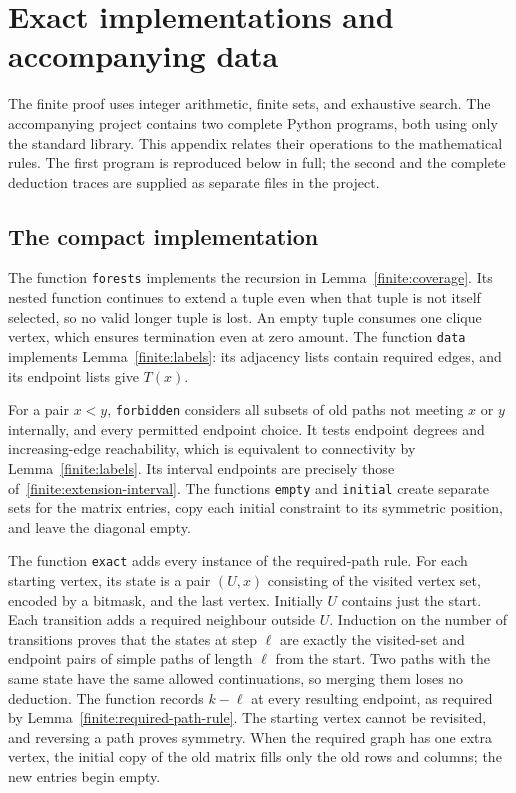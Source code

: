 \section{Exact implementations and accompanying data}
\label{app:implementation}

The finite proof uses integer arithmetic, finite sets, and exhaustive
search. The accompanying project contains two complete Python programs,
both using only the standard library. This appendix relates their
operations to the mathematical rules. The first program is reproduced
below in full; the second and the complete deduction traces are supplied
as separate files in the project.

\subsection{The compact implementation}

The function \texttt{forests} implements the recursion in
Lemma~\ref{finite:coverage}. Its nested function continues to extend a
tuple even when that tuple is not itself selected, so no valid longer
tuple is lost. An empty tuple consumes one clique vertex, which ensures
termination even at zero amount. The function \texttt{data} implements
Lemma~\ref{finite:labels}: its adjacency lists contain required edges,
and its endpoint lists give $T(x)$.

For a pair $x<y$, \texttt{forbidden} considers all subsets of old paths
not meeting $x$ or $y$ internally, and every permitted endpoint choice.
It tests endpoint degrees and increasing-edge reachability, which is
equivalent to connectivity by Lemma~\ref{finite:labels}. Its interval
endpoints are precisely those of~\eqref{finite:extension-interval}.
The functions \texttt{empty} and \texttt{initial} create separate sets
for the matrix entries, copy each initial constraint to its symmetric
position, and leave the diagonal empty.

The function \texttt{exact} adds every instance of the required-path
rule. For each starting vertex, its state is a pair $(U,x)$ consisting
of the visited vertex set, encoded by a bitmask, and the last vertex.
Initially $U$ contains just the start. Each transition adds a required
neighbour outside $U$. Induction on the number of transitions proves
that the states at step $\ell$ are exactly the visited-set and endpoint
pairs of simple paths of length $\ell$ from the start. Two paths with
the same state have the same allowed continuations, so merging them
loses no deduction. The function records $k-\ell$ at every resulting
endpoint, as required by Lemma~\ref{finite:required-path-rule}.
The starting vertex cannot be revisited, and reversing a path proves
symmetry. When the required graph has one extra vertex, the initial
copy of the old matrix fills only the old rows and columns; the new
entries begin empty.


